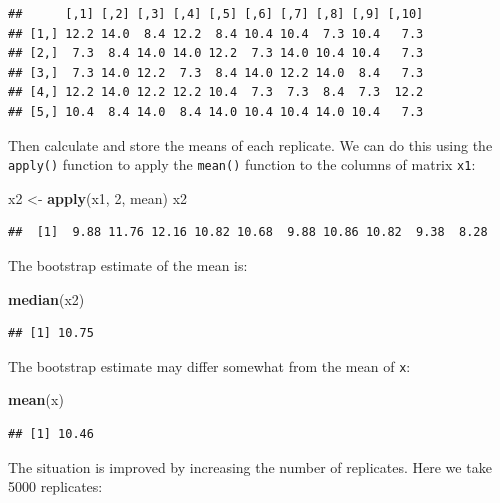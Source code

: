 \documentclass[12pt,a4paper]{book}
\newenvironment{Shaded}{\begin{snugshade}}{\end{snugshade}}
\newcommand{\DecValTok}[1]{\textcolor[rgb]{0.00,0.00,0.81}{#1}}
\newcommand{\KeywordTok}[1]{\textcolor[rgb]{0.13,0.29,0.53}{\textbf{#1}}}
\newcommand{\NormalTok}[1]{#1}
\newcommand{\StringTok}[1]{\textcolor[rgb]{0.31,0.60,0.02}{#1}}
\theoremstyle{definition}
\theoremstyle{definition}
\theoremstyle{definition}
\theoremstyle{remark}
\begin{document}
\begin{verbatim}
##      [,1] [,2] [,3] [,4] [,5] [,6] [,7] [,8] [,9] [,10]
## [1,] 12.2 14.0  8.4 12.2  8.4 10.4 10.4  7.3 10.4   7.3
## [2,]  7.3  8.4 14.0 14.0 12.2  7.3 14.0 10.4 10.4   7.3
## [3,]  7.3 14.0 12.2  7.3  8.4 14.0 12.2 14.0  8.4   7.3
## [4,] 12.2 14.0 12.2 12.2 10.4  7.3  7.3  8.4  7.3  12.2
## [5,] 10.4  8.4 14.0  8.4 14.0 10.4 10.4 14.0 10.4   7.3
\end{verbatim}

Then calculate and store the means of each replicate. We can do this
using the \texttt{apply()} function to apply the \texttt{mean()}
function to the columns of matrix \texttt{x1}:

\begin{Shaded}
\begin{Highlighting}[]
\NormalTok{x2 <-}\StringTok{ }\KeywordTok{apply}\NormalTok{(x1, }\DecValTok{2}\NormalTok{, mean)}
\NormalTok{x2}
\end{Highlighting}
\end{Shaded}

\begin{verbatim}
##  [1]  9.88 11.76 12.16 10.82 10.68  9.88 10.86 10.82  9.38  8.28
\end{verbatim}

The bootstrap estimate of the mean is:

\begin{Shaded}
\begin{Highlighting}[]
\KeywordTok{median}\NormalTok{(x2)}
\end{Highlighting}
\end{Shaded}

\begin{verbatim}
## [1] 10.75
\end{verbatim}

The bootstrap estimate may differ somewhat from the mean of \texttt{x}:

\begin{Shaded}
\begin{Highlighting}[]
\KeywordTok{mean}\NormalTok{(x)}
\end{Highlighting}
\end{Shaded}

\begin{verbatim}
## [1] 10.46
\end{verbatim}

The situation is improved by increasing the number of replicates. Here
we take 5000 replicates:
\end{document}
